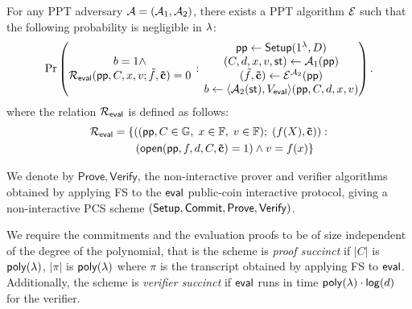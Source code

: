 \begin{definition}
\label{def:pcs-ext-app}
For any PPT adversary $\mathcal{A} = (\mathcal{A}_{1},\mathcal{A}_{2})$, there exists a PPT algorithm $\mathcal{E}$ such that the following probability is negligible in $\lambda$:
	 \[
    \Pr\left(
      \begin{matrix}
      b = 1 \wedge \\
      \mathcal{R}_{\mathsf{eval}}(\mathsf{pp},C,x,v; \tilde{f},\mathbf{\tilde{c}}) = 0
      \end{matrix}
      \,:\,
      \begin{matrix}
         \mathsf{pp} \leftarrow \mathsf{Setup}(1^{\lambda},D) \\
          (C,d,x,v,\mathsf{st}) \leftarrow \mathcal{A}_{1}(\mathsf{pp}) \\
         (\tilde{f},\mathbf{\tilde{c}}) \leftarrow \mathcal{E}^{\mathcal{A}_{2}}(\mathsf{pp})\\
         b \leftarrow \langle \mathcal{A}_{2}(\mathsf{st}), V_{\mathsf{eval}} \rangle(\mathsf{pp},C,d,x,v)
      \end{matrix}
    \right).
  \]
  where the relation $\mathcal{R}_{\mathsf{eval}}$ is defined as follows:
\begin{align*}
        \mathcal{R}_{\mathsf{eval}} &= \{\left((\mathsf{pp},C \in \mathbb{G},\; x \in \mathbb{F}, \; v \in \mathbb{F});\; (f(X), \mathbf{\tilde{c}}) \right) : \\
        &\qquad (
        \mathsf{open}(\mathsf{pp},f,d,C,\mathbf{\tilde{c}}) = 1 )
         \land v = f(x)  \}
    \end{align*} 
    
\end{definition}

We denote by $\mathsf{Prove}, \mathsf{Verify}$, the non-interactive prover and verifier algorithms obtained by applying FS to the 
$\mathsf{eval}$ public-coin interactive protocol, giving a non-interactive PCS scheme $(\mathsf{Setup},\mathsf{Commit},\allowbreak \mathsf{Prove},\mathsf{Verify})$.

\begin{definition}[Succinctness]
\label{def:pcs-succinct}
We require the commitments and the evaluation proofs to be of size independent of the degree of the polynomial, that is the scheme is \emph{proof succinct} if
$|C|$ is $\mathsf{poly}(\lambda)$, $|\pi|$ is $\mathsf{poly}(\lambda)$ where $\pi$ is the transcript obtained by applying FS to $\mathsf{eval}$. Additionally, the scheme is \emph{verifier succinct} if $\mathsf{eval}$ runs in time
$\mathsf{poly}(\lambda) \cdot \allowbreak \mathsf{log} (d)$ for the verifier.
\end{definition}


